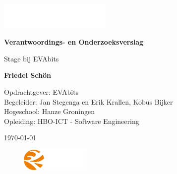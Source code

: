 \begin{titlepage}
\pagecolor{darkgray}\afterpage{\nopagecolor}
\color{white}
\centering
\vspace*{1cm}

\includegraphics[width=0.4\textwidth]{assets/evabits-white.png}\par\vspace{1cm} %

\Huge
\textbf{Verantwoordings- en Onderzoeksverslag}

\vspace{0.5cm}
\LARGE
Stage bij EVAbits

\vspace{1.5cm}

\textbf{Friedel Schön}

\vfill

\Large
Opdrachtgever: EVAbits \\
Begeleider: Jan Stegenga en Erik Krallen, Kobus Bijker \\
Hogeschool: Hanze Groningen \\
Opleiding: HBO-ICT - Software Engineering

\vspace{0.8cm}

\Large
\today

\vspace{1cm}

\begin{figure}[ht]
    \centering
    \includegraphics[width=0.3\textwidth]{assets/hanze-white.png} %
\end{figure}

\end{titlepage}
